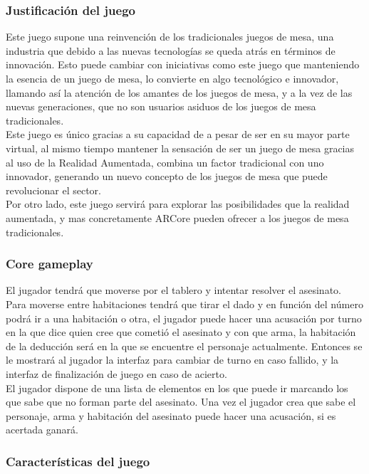 \subsubsection{Justificación del juego}
Este juego supone una reinvención de los tradicionales juegos de mesa, una industria que debido a las nuevas tecnologías se queda atrás en términos de innovación. Esto puede cambiar con iniciativas como este juego que manteniendo la esencia de un juego de mesa, lo convierte en algo tecnológico e innovador, llamando así la atención de los amantes de los juegos de mesa, y a la vez de las nuevas generaciones, que no son usuarios asiduos de los juegos de mesa tradicionales.\\

Este juego es único gracias a su capacidad de a pesar de ser en su mayor parte virtual, al mismo tiempo mantener la sensación de ser un juego de mesa gracias al uso de la Realidad Aumentada, combina un factor tradicional con uno innovador, generando un nuevo concepto de los juegos de mesa que puede revolucionar el sector.\\

Por otro lado, este juego servirá para explorar las posibilidades que la realidad aumentada, y mas concretamente ARCore pueden ofrecer a los juegos de mesa tradicionales.

\subsubsection{Core gameplay}
El jugador tendrá que moverse por el tablero y intentar resolver el asesinato. Para moverse entre habitaciones tendrá que tirar el dado y en función del número podrá ir a una habitación o otra, el jugador puede hacer una acusación por turno en la que dice quien cree que cometió el asesinato y con que arma, la habitación de la deducción será en la que se encuentre el personaje actualmente. Entonces se le mostrará al jugador la interfaz para cambiar de turno en caso fallido, y la interfaz de finalización de juego en caso de acierto.\\

El jugador dispone de una lista de elementos en los que puede ir marcando los que sabe que no forman parte del asesinato. Una vez el jugador crea que sabe el personaje, arma y habitación del asesinato puede hacer una acusación, si es acertada ganará.

\subsubsection{Características del juego}

